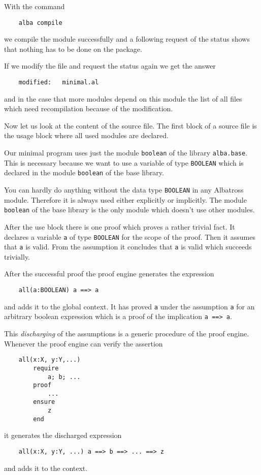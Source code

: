 With the command
\begin{lstlisting}
    alba compile
\end{lstlisting}
we compile the module successfully and a following request of the status shows
that nothing has to be done on the package.

If we modify the file and request the status again we get the answer
\begin{lstlisting}
    modified:   minimal.al
\end{lstlisting}
and in the case that more modules depend on this module the list of all
files which need recompilation because of the modification.

Now let us look at the content of the source file. The first block of a source
file is the usage block where all used modules are declared.

Our minimal program uses just the module \lstinline!boolean! of the library
\lstinline!alba.base!. This is necessary because we want to use a variable of
type \lstinline!BOOLEAN! which is declared in the module \lstinline!boolean!
of the base library.

You can hardly do anything without the data type \lstinline!BOOLEAN! in any
Albatross module. Therefore it is always used either explicitly or
implicitly. The module \lstinline!boolean! of the base library is the only
module which doesn't use other modules.

After the use block there is one proof which proves a rather trivial fact. It
declares a variable \lstinline!a! of type \lstinline!BOOLEAN! for the scope of
the proof. Then it assumes that \lstinline!a! is valid. From the assumption it
concludes that \lstinline!a! is valid which succeeds trivially.

After the successful proof the proof engine generates the expression
\begin{lstlisting}
    all(a:BOOLEAN) a ==> a
\end{lstlisting}
and adds it to the global context. It has proved \lstinline!a! under the
assumption \lstinline!a!  for an arbitrary boolean expression which is a proof
of the implication \lstinline!a ==> a!.

This {\em discharging} of the assumptions is a generic procedure of the proof
engine. Whenever the proof engine can verify the assertion
\begin{lstlisting}
    all(x:X, y:Y,...)
        require
            a; b; ...
        proof
            ...
        ensure
            z
        end
\end{lstlisting}
it generates the discharged expression
\begin{lstlisting}
    all(x:X, y:Y, ...) a ==> b ==> ... ==> z
\end{lstlisting}
and adds it to the context.

